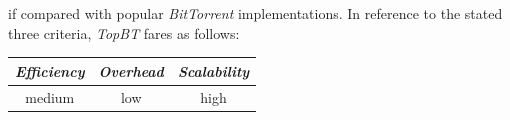 if compared with popular {\sl BitTorrent} implementations.
In reference to the stated three criteria, \emph{TopBT} fares as follows:
\begin{center}
{\footnotesize
\begin{tabular}{ccc}
\emph{Efficiency} & \emph{Overhead} & \emph{Scalability} \\
\hline
medium &
low &
high
\end{tabular}
}
\end{center}

